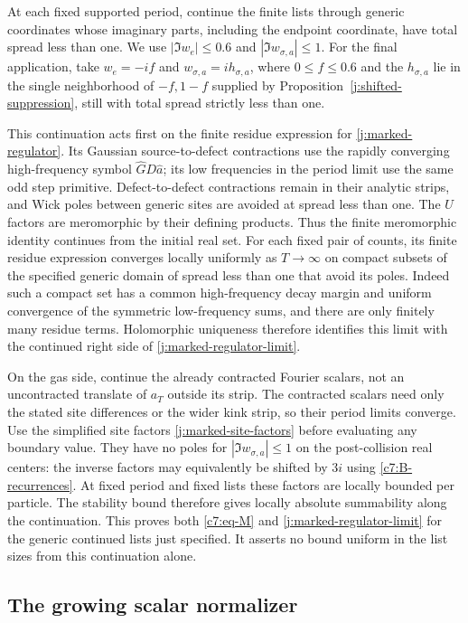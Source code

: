At each fixed supported period, continue the finite lists through
generic coordinates whose imaginary parts, including the endpoint
coordinate, have total spread less than one. We use
$|\Im w_e|\le0.6$ and $|\Im w_{\sigma,a}|\le1$. For the final
application, take $w_e=-if$ and $w_{\sigma,a}=ih_{\sigma,a}$,
where $0\le f\le0.6$ and the $h_{\sigma,a}$ lie in the single
neighborhood of $-f,1-f$ supplied by
Proposition~\ref{j:shifted-suppression}, still with total spread
strictly less than one.

This continuation acts first on the finite residue expression
for \eqref{j:marked-regulator}. Its Gaussian source-to-defect
contractions use the rapidly converging high-frequency symbol
$\widehat G D\widehat a$; its low frequencies in the period limit
use the same odd step primitive. Defect-to-defect contractions
remain in their analytic strips, and Wick poles between generic
sites are avoided at spread less than one. The $U$ factors are
meromorphic by their defining products. Thus the finite
meromorphic identity continues from the initial real set. For
each fixed pair of counts, its finite residue expression converges
locally uniformly as $T\to\infty$ on compact subsets of the
specified generic domain of spread less than one that avoid its poles.
Indeed such a compact set has a common high-frequency decay margin
and uniform convergence of the symmetric low-frequency sums, and
there are only finitely many residue terms. Holomorphic uniqueness
therefore identifies this limit with the continued right side of
\eqref{j:marked-regulator-limit}.

On the gas side, continue the already contracted Fourier
scalars, not an uncontracted translate of $a_T$ outside its
strip. The contracted scalars need only the stated site
differences or the wider kink strip, so their period limits
converge. Use the simplified site factors
\eqref{j:marked-site-factors} before evaluating any boundary
value. They have no poles for $|\Im w_{\sigma,a}|\le1$ on the
post-collision real centers: the inverse factors may equivalently
be shifted by $3i$ using \eqref{c7:B-recurrences}. At fixed
period and fixed lists these factors are locally bounded per
particle. The stability bound therefore gives locally absolute
summability along the continuation. This proves both
\eqref{c7:eq-M} and \eqref{j:marked-regulator-limit} for the
generic continued lists just specified. It asserts no bound
uniform in the list sizes from this continuation alone.

\subsection{The growing scalar normalizer}

